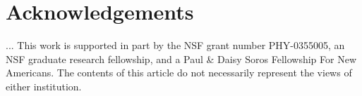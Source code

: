 \documentclass[12pt]{article}	%
\numberwithin{equation}{section} \setlength{\textwidth}{17.5cm}
\begin{document}
\section*{Acknowledgements}

...
%
%
This work is supported in part by the NSF grant number PHY-0355005, an NSF graduate research fellowship, and a Paul \& Daisy Soros Fellowship For New Americans. The contents of this article do not necessarily represent the views of either institution.




















\appendix
\end{document}
